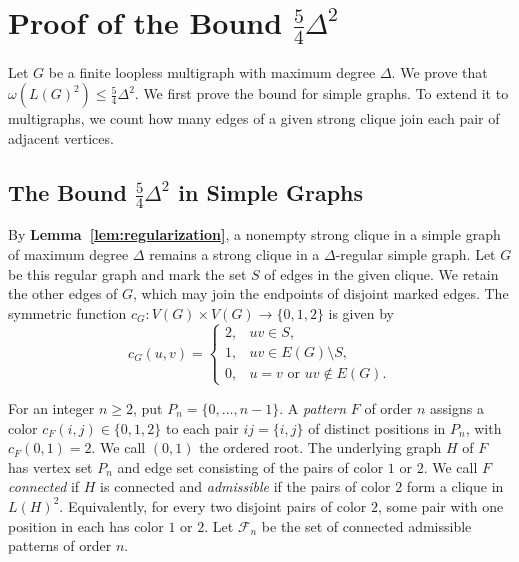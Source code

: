 \section{Proof of the Bound \texorpdfstring{$\frac{5}{4}\Delta^2$}{5 Delta squared / 4}}\label{sec:uniform}

Let $G$ be a finite loopless multigraph with maximum degree $\Delta$.
We prove that $\omega(L(G)^2)\leq\frac{5}{4}\Delta^2$. We first
prove the bound for simple graphs. To extend it to multigraphs, we
count how many edges of a given strong clique join each pair of
adjacent vertices.

\subsection{The Bound \texorpdfstring{$\frac{5}{4}\Delta^2$}{5 Delta squared / 4} in Simple Graphs}
\label{sec:simple-proof}\label{sec:finite-model}\label{sec:identities}\label{sec:finite-instance}
\label{subsubsec:conditional-extension-counts}

By \textbf{Lemma~\ref{lem:regularization}}, a nonempty strong clique
in a simple graph of maximum degree $\Delta$ remains a strong clique
in a $\Delta$-regular simple graph. Let $G$ be this regular graph and
mark the set $S$ of edges in the given clique. We retain the other
edges of $G$, which may join the endpoints of disjoint marked edges.
The symmetric function
$c_G\colon V(G)\times V(G)\to\{0,1,2\}$ is given by
\[
 c_G(u,v)=
 \begin{cases}
  2,&uv\in S,\\
  1,&uv\in E(G)\setminus S,\\
  0,&u=v\text{ or }uv\notin E(G).
 \end{cases}
\]

\begin{defn}\label{def:patterns}
For an integer $n\geq2$, put $P_n=\{0,\ldots,n-1\}$. A \emph{pattern}
$F$ of order $n$ assigns a color $c_F(i,j)\in\{0,1,2\}$ to each pair
$ij=\{i,j\}$ of distinct positions in $P_n$, with $c_F(0,1)=2$. We
call $(0,1)$ the ordered root. The underlying graph $H$ of $F$ has
vertex set $P_n$ and edge set consisting of the pairs of color $1$
or $2$. We call $F$ \emph{connected} if $H$ is connected and
\emph{admissible} if the pairs of color $2$ form a clique in $L(H)^2$.
Equivalently, for every two disjoint pairs of color $2$, some pair
with one position in each has color $1$ or $2$.
Let $\mathcal F_n$ be the set of connected admissible patterns of order $n$.
\end{defn}

